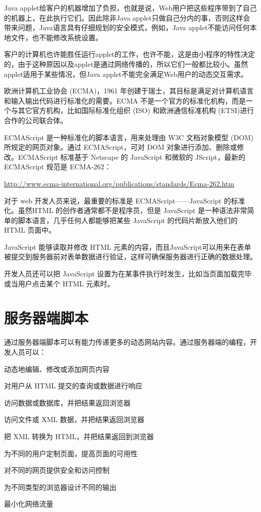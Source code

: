 Java applet给客户的机器增加了负担，也就是说，Web用户把这些程序带到了自己的机器上，在此执行它们。因此除非Java applet只做自己分内的事，否则这样会带来问题，Java语言具有仔细规划的安全模式，例如，Java applet不能访问任何本地文件，也不能修改系统设置。


客户的计算机也许能胜任运行applet的工作，也许不能，这是由小程序的特性决定的，由于这种原因以及applet是通过网络传播的，所以它们一般都比较小。虽然applet适用于某些情况，但Java applet不能完全满足Web用户的动态交互需求。



欧洲计算机工业协会 (ECMA)，1961 年创建于瑞士，其目标是满足对计算机语言和输入输出代码进行标准化的需要。ECMA 不是一个官方的标准化机构，而是一个与其它官方机构，比如国际标准化组织 (ISO) 和欧洲通信标准机构 (ETSI)进行合作的公司联合体。


ECMAScript 是一种标准化的脚本语言，用来处理由 W3C 文档对象模型 (DOM) 所规定的网页对象。通过 ECMAScript，可对 DOM 对象进行添加、删除或修改。ECMAScript 标准基于 Netscape 的 JavaScript 和微软的 JScript，最新的 ECMAScript 规范是 ECMA-262：

\url{http://www.ecma-international.org/publications/standards/Ecma-262.htm}

对于 web 开发人员来说，最重要的标准是 ECMAScript——JavaScript 的标准化。虽然HTML 的创作者通常都不是程序员，但是 JavaScript 是一种语法非常简单的脚本语言，几乎任何人都能够把某些 JavaScript 的代码片断放入他们的 HTML 页面中。



JavaScript 能够读取并修改 HTML 元素的内容，而且JavaScript可以用来在表单被提交到服务器前对表单数据进行验证，这样可确保服务器进行正确的数据处理。

开发人员还可以把 JavaScript 设置为在某事件执行时发生，比如当页面加载完毕或当用户点击某个 HTML 元素时。






\section{服务器端脚本}



通过服务器端脚本可以有能力传递更多的动态网站内容。通过服务器端的编程，开发人员可以：

\begin{compactitem}
\item 动态地编辑、修改或添加网页内容
\item 对用户从 HTML 提交的查询或数据进行响应
\item 访问数据或数据库，并把结果返回浏览器
\item 访问文件或 XML 数据，并把结果返回浏览器
\item 把 XML 转换为 HTML，并把结果返回到浏览器
\item 为不同的用户定制页面，提高页面的可用性
\item 对不同的网页提供安全和访问控制
\item 为不同类型的浏览器设计不同的输出
\item 最小化网络流量
\end{compactitem}


